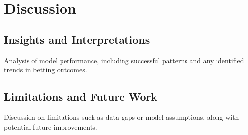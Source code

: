 \section{Discussion}
    \subsection{Insights and Interpretations}
    Analysis of model performance, including successful patterns and any identified trends in betting outcomes.

    \subsection{Limitations and Future Work}
    Discussion on limitations such as data gaps or model assumptions, along with potential future improvements.